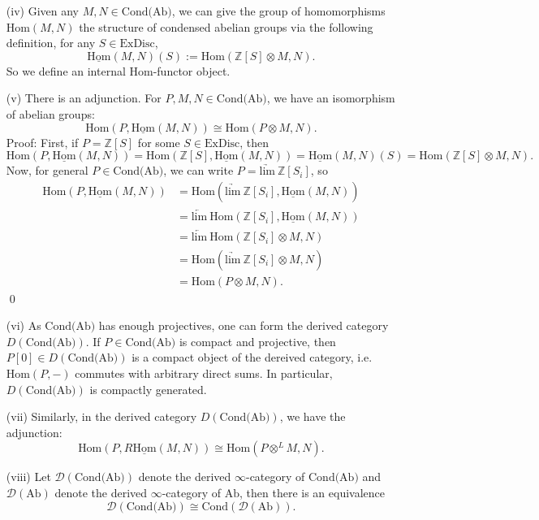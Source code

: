 \documentclass[UTF8,12,a4paper]{ctexart}
\theoremstyle{definition}
\begin{document}
\begin{itemize}
	
	\item [(iv)] Given any $M, N\in \text{Cond(Ab)}$, we can give the group of homomorphisms $\text{Hom}(M, N)$ the structure of condensed abelian groups via the following definition, for any $S\in \text{ExDisc}$,
	$$\underline{\text{Hom}}(M,N)(S):=\text{Hom}(\mathbb{Z}[S]\otimes M, N).$$ 
	So we define an internal Hom-functor object.
	\item [(v)] There is an adjunction. For $P, M, N\in \text{Cond(Ab)}$, we have an isomorphism of abelian groups:
	$$\text{Hom}(P,\underline{\text{Hom}}(M,N))\cong \text{Hom}(P\otimes M, N). $$ 
	Proof:
	First, if $P=\mathbb{Z}[S]$ for some $S\in\text{ExDisc}$, then
	$$\text{Hom}(P,\underline{\text{Hom}}(M,N))=\text{Hom}(\mathbb{Z}[S],\underline{\text{Hom}}(M,N))=\underline{\text{Hom}}(M,N)(S)=\text{Hom}(\mathbb{Z}[S]\otimes M, N).$$
	Now, for general $P\in \text{Cond(Ab)}$, we can write $P=\underrightarrow{\text{lim}}\ \mathbb{Z}[S_i]$, so 
     \begin{align*}
     	\text{Hom}(P,\underline{\text{Hom}}(M,N))
     	&=\text{Hom}(\underrightarrow{\text{lim}}\ \mathbb{Z}[S_i],\underline{\text{Hom}}(M,N))\\
     	&=\underleftarrow{\text{lim}}\ \text{Hom}(\mathbb{Z}[S_i],\underline{\text{Hom}}(M,N))\\
     	&=\underleftarrow{\text{lim}}\ \text{Hom}(\mathbb{Z}[S_i]\otimes M, N)\\
     	&=\text{Hom}(\underrightarrow{\text{lim}}\ \mathbb{Z}[S_i]\otimes M, N)\\
     	&=\text{Hom}(P\otimes M, N).
     \end{align*}
	\qed

	
		
	\item [(vi)] As $\text{Cond(Ab)}$ has enough projectives, one can form the derived category $D(\text{Cond(Ab)})$. If $P\in \text{Cond(Ab)}$ is compact and projective, then $P[0]\in D(\text{Cond(Ab)})$ is a compact object of the dereived category, i.e. $\text{Hom}(P,-)$ commutes with arbitrary direct sums. In particular, $D(\text{Cond(Ab)})$ is compactly generated.
	\item [(vii)] Similarly, in the derived category $D(\text{Cond(Ab)})$, we have the adjunction:
	$$\text{Hom}(P,R\underline{\text{Hom}}(M,N))\cong \text{Hom}(P\otimes^L M, N).$$
	\item [(viii)] Let $\mathcal{D}(\text{Cond(Ab)})$ denote the derived $\infty$-category of $\text{Cond(Ab)}$ and $\mathcal{D}(\text{Ab})$ denote the derived $\infty$-category of $\text{Ab}$, then there is an equivalence
	$$\mathcal{D}(\text{Cond(Ab)})\cong \text{Cond}(\mathcal{D}(\text{Ab})).$$
\end{itemize}
\end{document}
